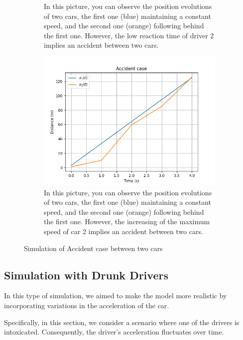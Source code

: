 \documentclass{article}
\begin{document}
\begin{figure}[H]
\begin{subfigure}[b]{0.45\textwidth}
				\caption{In this picture, you can observe the position evolutions of two cars, the first one (blue) maintaining a constant speed, and the second one (orange) following behind the first one. However, the low reaction time of driver 2 implies an accident between two cars.}
				\label{fig:sub2}
			\end{subfigure}
			
			\vspace{1cm}
			
			\begin{subfigure}[b]{0.7\textwidth}
				\centering
				\includegraphics[width=\textwidth]{1W2_Acc3.png}
				\caption{In this picture, you can observe the position evolutions of two cars, the first one (blue) maintaining a constant speed, and the second one (orange) following behind the first one. However, the increasing of the maximum speed of car 2 implies an accident between two cars.}
				\label{fig:sub3}
			\end{subfigure}
			\caption{Simulation of Accident case between two cars}
			\label{fig:accident_simulation}
		\end{figure}
		
		
		\subsection{Simulation with Drunk Drivers}
		
		In this type of simulation, we aimed to make the model more realistic by incorporating variations in the acceleration of the car.
		
		Specifically, in this section, we consider a scenario where one of the drivers is intoxicated. Consequently, the driver's acceleration fluctuates over time.
		
\end{document}

